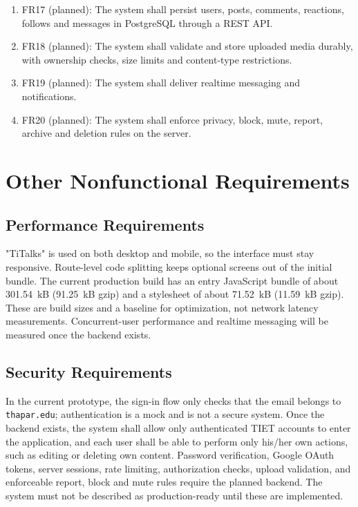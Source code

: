 \documentclass{scrreprt}
\begin{document}
\begin{enumerate}
    \item FR17 (planned): The system shall persist users, posts, comments, reactions, follows and messages in PostgreSQL through a REST API.
    \item FR18 (planned): The system shall validate and store uploaded media durably, with ownership checks, size limits and content-type restrictions.
    \item FR19 (planned): The system shall deliver realtime messaging and notifications.
    \item FR20 (planned): The system shall enforce privacy, block, mute, report, archive and deletion rules on the server.
\end{enumerate}

\chapter{Other Nonfunctional Requirements}

\section{Performance Requirements}
"TiTalks" is used on both desktop and mobile, so the interface must stay responsive. Route-level code splitting keeps optional screens out of the initial bundle. The current production build has an entry JavaScript bundle of about 301.54~kB (91.25~kB gzip) and a stylesheet of about 71.52~kB (11.59~kB gzip). These are build sizes and a baseline for optimization, not network latency measurements. Concurrent-user performance and realtime messaging will be measured once the backend exists.

\section{Security Requirements}
In the current prototype, the sign-in flow only checks that the email belongs to \texttt{thapar.edu}; authentication is a mock and is not a secure system. Once the backend exists, the system shall allow only authenticated TIET accounts to enter the application, and each user shall be able to perform only his/her own actions, such as editing or deleting own content. Password verification, Google OAuth tokens, server sessions, rate limiting, authorization checks, upload validation, and enforceable report, block and mute rules require the planned backend. The system must not be described as production-ready until these are implemented.
\end{document}
